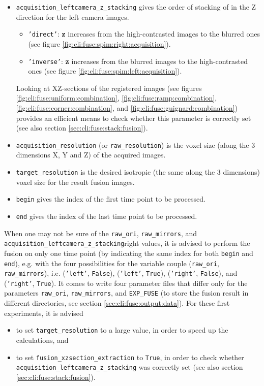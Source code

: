 \begin{itemize}
\item \texttt{acquisition\_leftcamera\_z\_stacking}
 gives the order of stacking of in the Z direction for the left camera images.
\begin{itemize}
\itemsep -0.5ex
\item \texttt{'direct'}: \textbf{z} increases from the high-contrasted images to the blurred ones (see figure \ref{fig:cli:fuse:spim:right:acquisition}).
\item \texttt{'inverse'}: \textbf{z} increases from the blurred images to the high-contrasted ones (see figure \ref{fig:cli:fuse:spim:left:acquisition}).
\end{itemize}
Looking at XZ-sections of the registered images (see figures \ref{fig:cli:fuse:uniform:combination}, \ref{fig:cli:fuse:ramp:combination}, \ref{fig:cli:fuse:corner:combination}, and \ref{fig:cli:fuse:guignard:combination}) provides an efficient means to check whether this parameter is correctly set (see also section \ref{sec:cli:fuse:stack:fusion}).

\item \texttt{acquisition\_resolution} (or \texttt{raw\_resolution}) is the voxel size (along the 3
    dimensions X, Y and Z) of the acquired images.
\item \texttt{target\_resolution} is the desired isotropic (the
    same along the 3 dimensions) voxel size for the result fusion
    images.
\item \texttt{begin} gives the index of the first time point to be
  processed.
\item \texttt{end} gives the index of the last time point to be processed.
\end{itemize}


When one may not be sure of the \texttt{raw\_ori},
\texttt{raw\_mirrors}, and  \texttt{acquisition\_leftcamera\_z\_stacking}right values, it is advised to perform the
fusion on only one time point (by indicating the same index for both
\texttt{begin}  and \texttt{end}), e.g. with the four possibilities for the
variable couple (\texttt{raw\_ori}, \texttt{raw\_mirrors}), i.e.
(\texttt{'left'}, \texttt{False}),
(\texttt{'left'}, \texttt{True}),
(\texttt{'right'}, \texttt{False}), and
(\texttt{'right'}, \texttt{True}).
It comes to write four parameter files that differ only for the
parameters \texttt{raw\_ori}, \texttt{raw\_mirrors}, and
\texttt{EXP\_FUSE}  (to store the fusion result in different
directories, see section \ref{sec:cli:fuse:output:data}).
For these first experiments, it is advised 
\begin{itemize}
\itemsep -0.5ex
\item to set
\texttt{target\_resolution} to a large value, in order to speed up the
calculations, and
\item to set  \texttt{fusion\_xzsection\_extraction} to \texttt{True}, in order to check whether \texttt{acquisition\_leftcamera\_z\_stacking} was correctly set (see also section \ref{sec:cli:fuse:stack:fusion}).
\end{itemize}


